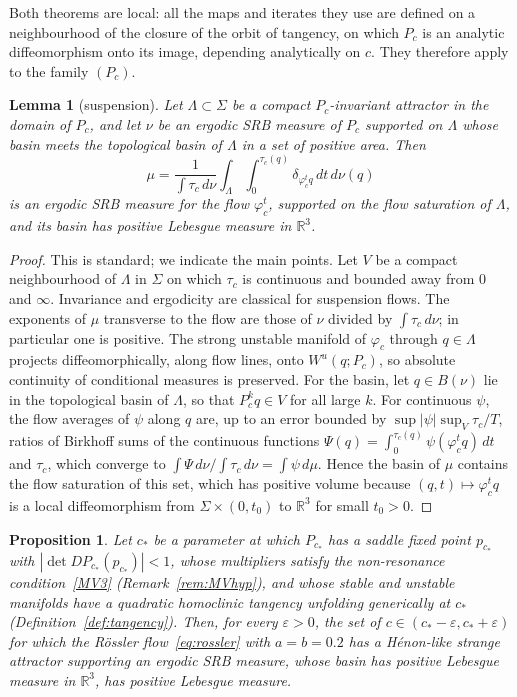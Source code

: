 \documentclass[11pt]{amsart}
\newtheorem{lemma}[thm]{Lemma}
\newtheorem{proposition}[thm]{Proposition}
\theoremstyle{definition}
\theoremstyle{remark}
\newcommand{\R}{\mathbb{R}}
\newcommand{\Wu}{W^u}
\newcommand{\cs}{c_*}
\begin{document}
Both theorems are local: all the maps and iterates they use are defined on a neighbourhood of the closure
of the orbit of tangency, on which $P_c$ is an analytic diffeomorphism onto its image, depending
analytically on $c$. They therefore apply to the family $(P_c)$.

\begin{lemma}[suspension]\label{lem:suspension}
Let $\Lambda\subset\Sigma$ be a compact $P_c$-invariant attractor in the domain of $P_c$, and let $\nu$ be
an ergodic SRB measure of $P_c$ supported on $\Lambda$ whose basin meets the topological basin of
$\Lambda$ in a set of positive area. Then
\[
\mu=\frac{1}{\int\tau_c\,d\nu}\int_\Lambda\int_0^{\tau_c(q)}\delta_{\varphi_c^t q}\,dt\,d\nu(q)
\]
is an ergodic SRB measure for the flow $\varphi_c^t$, supported on the flow saturation of $\Lambda$, and
its basin has positive Lebesgue measure in $\R^3$.
\end{lemma}

\begin{proof}
This is standard; we indicate the main points. Let $V$ be a compact neighbourhood of $\Lambda$ in
$\Sigma$ on which $\tau_c$ is continuous and bounded away from $0$ and $\infty$. Invariance and
ergodicity are classical for suspension flows. The exponents of $\mu$ transverse to the flow are those of
$\nu$ divided by $\int\tau_c\,d\nu$; in particular one is positive. The strong unstable manifold of
$\varphi_c$ through $q\in\Lambda$ projects diffeomorphically, along flow lines, onto $\Wu(q;P_c)$, so
absolute continuity of conditional measures is preserved. For the basin, let $q\in B(\nu)$ lie in the
topological basin of $\Lambda$, so that $P_c^kq\in V$ for all large $k$. For continuous $\psi$, the flow
averages of $\psi$ along $q$ are, up to an error bounded by $\sup|\psi|\sup_V\tau_c/T$, ratios of Birkhoff
sums of the continuous functions $\Psi(q)=\int_0^{\tau_c(q)}\psi(\varphi^t_cq)\,dt$ and $\tau_c$, which
converge to $\int\Psi\,d\nu\big/\!\int\tau_c\,d\nu=\int\psi\,d\mu$. Hence the basin of $\mu$ contains the
flow saturation of this set, which has positive volume because $(q,t)\mapsto\varphi^t_cq$ is a local
diffeomorphism from $\Sigma\times(0,t_0)$ to $\R^3$ for small $t_0>0$.
\end{proof}

\begin{proposition}\label{prop:srb}
Let $\cs$ be a parameter at which $P_{\cs}$ has a saddle fixed point $p_{\cs}$ with
$|\det DP_{\cs}(p_{\cs})|<1$, whose multipliers satisfy the non-resonance condition~\ref{MV3}
(Remark~\ref{rem:MVhyp}), and whose stable and unstable manifolds have a quadratic homoclinic tangency
unfolding generically at $\cs$ (Definition~\ref{def:tangency}). Then, for every $\varepsilon>0$, the set of
$c\in(\cs-\varepsilon,\cs+\varepsilon)$ for which the R\"ossler flow~\eqref{eq:rossler} with $a=b=0.2$ has a
H\'enon-like strange attractor supporting an ergodic SRB measure, whose basin has positive Lebesgue measure
in $\R^3$, has positive Lebesgue measure.
\end{proposition}
\end{document}
